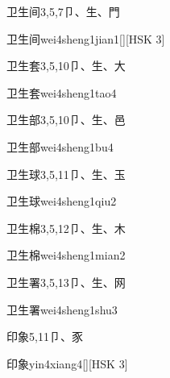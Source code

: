 \begin{entry}{卫生间}{3,5,7}{⼙、⽣、⾨}
  \begin{phonetics}{卫生间}{wei4sheng1jian1}[][HSK 3]
  \end{phonetics}
\end{entry}

\begin{entry}{卫生套}{3,5,10}{⼙、⽣、⼤}
  \begin{phonetics}{卫生套}{wei4sheng1tao4}
  \end{phonetics}
\end{entry}

\begin{entry}{卫生部}{3,5,10}{⼙、⽣、⾢}
  \begin{phonetics}{卫生部}{wei4sheng1bu4}
  \end{phonetics}
\end{entry}

\begin{entry}{卫生球}{3,5,11}{⼙、⽣、⽟}
  \begin{phonetics}{卫生球}{wei4sheng1qiu2}
  \end{phonetics}
\end{entry}

\begin{entry}{卫生棉}{3,5,12}{⼙、⽣、⽊}
  \begin{phonetics}{卫生棉}{wei4sheng1mian2}
  \end{phonetics}
\end{entry}

\begin{entry}{卫生署}{3,5,13}{⼙、⽣、⽹}
  \begin{phonetics}{卫生署}{wei4sheng1shu3}
  \end{phonetics}
\end{entry}

\begin{entry}{印象}{5,11}{⼙、⾗}
  \begin{phonetics}{印象}{yin4xiang4}[][HSK 3]
  \end{phonetics}
\end{entry}

